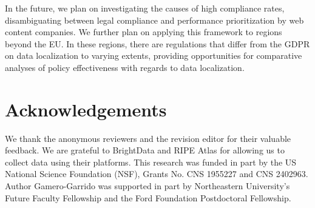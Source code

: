 In the future, we plan on investigating the causes of high compliance rates,
disambiguating between legal compliance and performance prioritization by
web content companies. We further plan on applying this framework to regions
beyond the EU. In these regions, there are regulations that differ from the GDPR
on data localization to varying extents, providing opportunities for comparative
analyses of policy effectiveness with regards to data localization.

\section{Acknowledgements}
We thank the anonymous reviewers and the revision editor for their
valuable feedback. We are grateful to BrightData and RIPE Atlas
for allowing us to collect data using their platforms. 
This research was funded in part by the 
US National Science Foundation (NSF), Grants No. CNS 1955227 and CNS 2402963.
Author Gamero-Garrido was supported in part by Northeastern University's 
Future Faculty Fellowship and the Ford Foundation Postdoctoral Fellowship.
